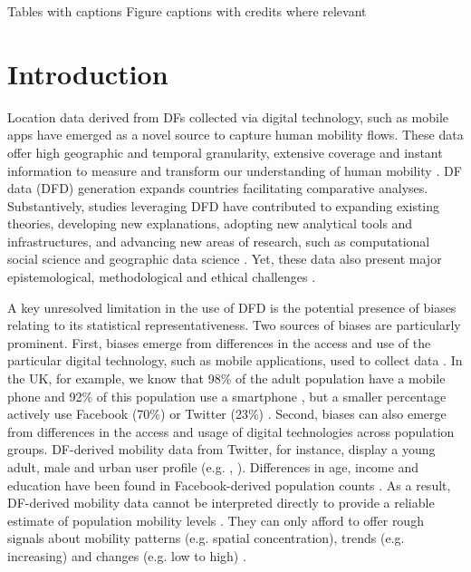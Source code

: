 \documentclass[]{rsos}%
\begin{document}
Tables with captions Figure captions with credits where relevant

\newpage

\section{Introduction}\label{introduction}




Location data derived from DFs collected via digital technology, such as mobile apps have emerged
as a novel source to capture human mobility flows. These data offer high geographic and temporal
granularity, extensive coverage and instant information to measure and transform our understanding
of human mobility \cite{oliver20-health}. DF data (DFD) generation expands countries facilitating
comparative analyses. Substantively, studies leveraging DFD have contributed to expanding existing
theories, developing new explanations, adopting new analytical tools and infrastructures, and
advancing new areas of research, such as computational social science and geographic data science
\cite{pappalardo23-directions}. Yet, these data also present major epistemological, methodological and ethical challenges \cite{rowe23-bigdata}.

A key unresolved limitation in the use of DFD is the potential presence of biases relating to its
statistical representativeness. Two sources of biases are particularly prominent. First, biases emerge from differences in the access and use of the particular digital technology, such as mobile
applications, used to collect data \cite{wesolowski13-biases}. In the UK, for example, we know that 98\% of the adult population have a mobile phone and 92\% of this population use a smartphone \cite{ofcom23}, but a smaller percentage actively use Facebook (70\%) or Twitter (23\%) \cite{statista24}. Second, biases can also emerge from differences in the access and usage of digital technologies across population groups. DF-derived mobility data from Twitter, for instance, display a young adult, male and urban user profile (e.g. \cite{mislove21-twitter}, \cite{sloan13-twitter}). Differences in age, income and education have been found in Facebook-derived population counts \cite{ribeiro20-facebook}. As a result, DF-derived mobility data cannot be interpreted directly to provide a reliable estimate of population mobility levels \cite{cesare18-promises}. They can only afford to offer rough signals about mobility patterns (e.g. spatial concentration), trends (e.g. increasing) and changes (e.g. low to high)
\cite{rowe22-sensing-ukraine}.
\end{document}
